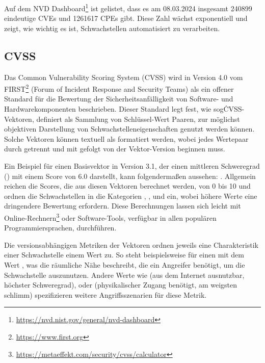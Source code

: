 \newline{}

Auf dem NVD Dashboard\footnote{\url{https://nvd.nist.gov/general/nvd-dashboard}} ist gelistet, dass es am 08.03.2024 insgesamt 240899 eindeutige CVEs und 1261617 CPEs gibt.
Diese Zahl wächst exponentiell und zeigt, wie wichtig es ist, Schwachstellen automatisiert zu verarbeiten.

\subsection{CVSS} \label{subsec:projektbericht-grundlagen-cvss}

Das Common Vulnerability Scoring System (CVSS) wird in Version 4.0 \cite{CVSSv4.0Specification} vom FIRST\footnote{\url{https://www.first.org}} (Forum of Incident Response and Security Teams) als ein offener Standard für die Bewertung der Sicherheitsanfälligkeit von Software- und Hardwarekomponenten beschrieben.
Dieser Standard legt fest, wie sog\. CVSS-Vektoren, definiert als Sammlung von Schlüssel-Wert Paaren, zur möglichst objektiven Darstellung von Schwachstelleneigenschaften genutzt werden können.
Solche Vektoren können textuell als  formatiert werden, wobei jedes Wertepaar durch \qt{/} getrennt und mit  gefolgt von der Vektor-Version beginnen muss.

Ein Beispiel für einen Basisvektor in Version 3.1, der einen mittleren Schweregrad () mit einem Score von 6.0 darstellt, kann folgendermaßen aussehen: .
Allgemein reichen die Scores, die aus diesen Vektoren berechnet werden, von 0 bis 10 und ordnen die Schwachstellen in die Kategorien , ,  und  ein, wobei höhere Werte eine dringendere Bewertung erfordern.
Diese Berechnungen lassen sich leicht mit Online-Rechnern\footnote{\url{https://metaeffekt.com/security/cvss/calculator}} oder Software-Tools, verfügbar in allen populären Programmiersprachen, durchführen.

Die versionsabhängigen Metriken der Vektoren ordnen jeweils eine Charakteristik einer Schwachstelle einem Wert zu.
So steht beispielsweise  für einen  mit dem Wert , was die räumliche Nähe beschreibt, die ein Angreifer benötigt, um die Schwachstelle auszunutzen.
Andere Werte wie  (aus dem Internet ausnutzbar, höchster Schweregrad),  oder  (physikalischer Zugang benötigt, am weigsten schlimm) spezifizieren weitere Angriffsszenarien für diese Metrik.


